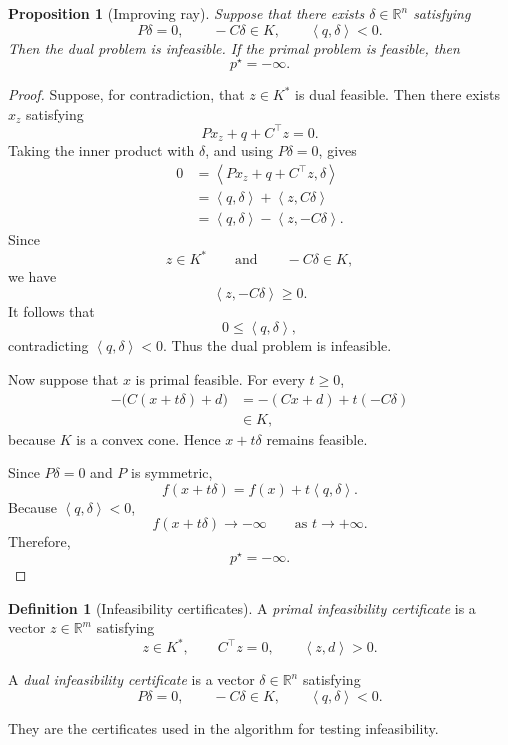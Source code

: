 \documentclass[a4paper,11pt]{book}
\theoremstyle{plain}
\newtheorem{proposition}[theorem]{Proposition}
\theoremstyle{definition}
\newtheorem{definition}[theorem]{Definition}
\theoremstyle{remark}
\numberwithin{equation}{chapter}
\numberwithin{algorithm}{chapter}
\newcommand{\R}{\mathbb{R}}
\newcommand{\inner}[2]{\left\langle #1, #2 \right\rangle}
\begin{document}
	\begin{proposition}[Improving ray]
		Suppose that there exists \(\delta\in\R^n\) satisfying
		\begin{equation}
			P\delta=0,
			\qquad
			-C\delta\in K,
			\qquad
			\inner{q}{\delta}<0.
			\label{eq:dual-infeasibility-ray}
		\end{equation}
		Then the dual problem is infeasible. If the primal problem is feasible, then
		\[
		p^\star=-\infty.
		\]
	\end{proposition}
	
	\begin{proof}
		Suppose, for contradiction, that \(z\in K^*\) is dual feasible. Then there
		exists \(x_z\) satisfying
		\[
		Px_z+q+C^\top z=0.
		\]
		Taking the inner product with \(\delta\), and using \(P\delta=0\), gives
		\begin{align}
			0
			&=
			\inner{Px_z+q+C^\top z}{\delta}\\
			&=
			\inner{q}{\delta}
			+
			\inner{z}{C\delta}\\
			&=
			\inner{q}{\delta}
			-
			\inner{z}{-C\delta}.
		\end{align}
		Since
		\[
		z\in K^*
		\qquad\text{and}\qquad
		-C\delta\in K,
		\]
		we have
		\[
		\inner{z}{-C\delta}\geq0.
		\]
		It follows that
		\[
		0
		\leq
		\inner{q}{\delta},
		\]
		contradicting \(\inner{q}{\delta}<0\). Thus the dual problem is infeasible.
		
		Now suppose that \(x\) is primal feasible. For every \(t\geq0\),
		\begin{align}
			-\bigl(C(x+t\delta)+d\bigr)
			&=
			-(Cx+d)+t(-C\delta)\\
			&\in K,
		\end{align}
		because \(K\) is a convex cone. Hence \(x+t\delta\) remains feasible.
		
		Since \(P\delta=0\) and \(P\) is symmetric,
		\[
		f(x+t\delta)
		=
		f(x)+t\inner{q}{\delta}.
		\]
		Because \(\inner{q}{\delta}<0\),
		\[
		f(x+t\delta)\longrightarrow-\infty
		\qquad
		\text{as }t\to+\infty.
		\]
		Therefore,
		\[
		p^\star=-\infty.
		\]
	\end{proof}
	
	\begin{definition}[Infeasibility certificates]\label{def:certificates}
		A \emph{primal infeasibility certificate} is a vector \(z\in\R^m\)
		satisfying
		\begin{equation}
			z\in K^*,
			\qquad
			C^\top z=0,
			\qquad
			\inner{z}{d}>0.
		\end{equation}
		
		A \emph{dual infeasibility certificate} is a vector
		\(\delta\in\R^n\) satisfying
		\begin{equation}
			P\delta=0,
			\qquad
			-C\delta\in K,
			\qquad
			\inner{q}{\delta}<0.
		\end{equation}
		
		They are the certificates used in the algorithm for testing infeasibility.
	\end{definition}
	
\end{document}
